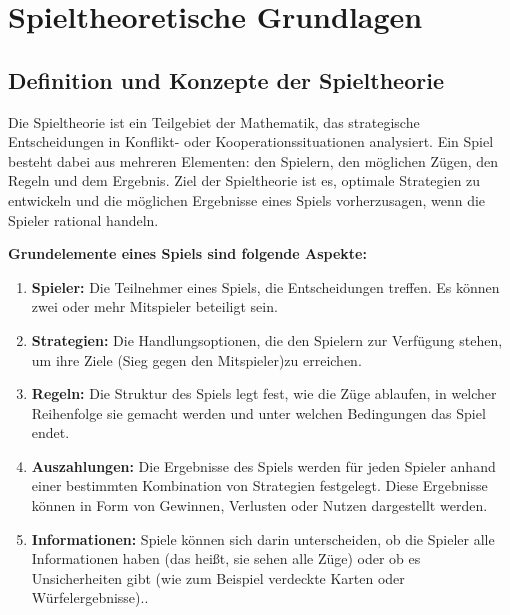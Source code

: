 \chapter{Spieltheoretische Grundlagen}


\section{Definition und Konzepte der Spieltheorie}
Die Spieltheorie ist ein Teilgebiet der Mathematik, das strategische Entscheidungen in Konflikt- oder Kooperationssituationen analysiert. Ein Spiel besteht dabei aus mehreren Elementen: den Spielern, den möglichen Zügen, den Regeln und dem Ergebnis. Ziel der Spieltheorie ist es, optimale Strategien zu entwickeln und die möglichen Ergebnisse eines Spiels vorherzusagen, wenn die Spieler rational handeln.

\textbf{Grundelemente eines Spiels sind folgende Aspekte:}

\begin{enumerate}
	\item \textbf{Spieler:} Die Teilnehmer eines Spiels, die Entscheidungen treffen. Es können zwei oder mehr Mitspieler beteiligt sein.
	\item \textbf{Strategien:} Die Handlungsoptionen, die den Spielern zur Verfügung stehen, um ihre Ziele (Sieg gegen den Mitspieler)zu erreichen.
	\item \textbf{Regeln:} Die Struktur des Spiels legt fest, wie die Züge ablaufen, in welcher Reihenfolge sie gemacht werden und unter welchen Bedingungen das Spiel endet.
	\item \textbf{Auszahlungen:} Die Ergebnisse des Spiels werden für jeden Spieler anhand einer bestimmten Kombination von Strategien festgelegt. Diese Ergebnisse können in Form von Gewinnen, Verlusten oder Nutzen dargestellt werden.
	\item \textbf{Informationen:} Spiele können sich darin unterscheiden, ob die Spieler alle Informationen haben (das heißt, sie sehen alle Züge) oder ob es Unsicherheiten gibt (wie zum Beispiel verdeckte Karten oder Würfelergebnisse).\autocite{holler_einfuhrung_2019}.
\end{enumerate}

